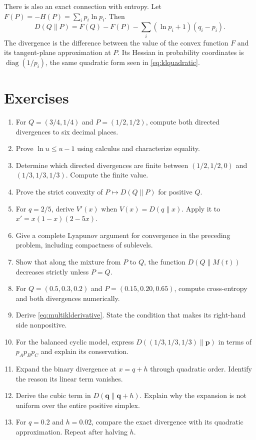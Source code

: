 \documentclass[11pt,oneside,openany]{book}
\theoremstyle{definition}
\theoremstyle{remark}
\newenvironment{exercises}{\begin{enumerate}[label=\thechapter.\arabic*,ref=\thechapter.\arabic*,leftmargin=2.8em,itemsep=6pt]}{\end{enumerate}}
\newcommand{\diag}{\operatorname{diag}}
\newcommand{\p}{\mathbf{p}}
\newcommand{\q}{\mathbf{q}}
\numberwithin{equation}{chapter}
\begin{document}
There is also an exact connection with entropy. Let $F(P)=-H(P)=\sum_i p_i\ln p_i$. Then
\begin{equation}\label{eq:bregman}
D(Q\|P)=F(Q)-F(P)-\sum_i(\ln p_i+1)(q_i-p_i).
\end{equation}
The divergence is the difference between the value of the convex function $F$ and its tangent-plane approximation at $P$. Its Hessian in probability coordinates is $\diag(1/p_i)$, the same quadratic form seen in \eqref{eq:klquadratic}.

\FloatBarrier
\section{Exercises}
\begin{exercises}
\item For $Q=(3/4,1/4)$ and $P=(1/2,1/2)$, compute both directed divergences to six decimal places.
\item Prove $\ln u\leq u-1$ using calculus and characterize equality.
\item Determine which directed divergences are finite between $(1/2,1/2,0)$ and $(1/3,1/3,1/3)$. Compute the finite value.
\item Prove the strict convexity of $P\mapsto D(Q\|P)$ for positive $Q$.
\item For $q=2/5$, derive $V'(x)$ when $V(x)=D(q\|x)$. Apply it to $x'=x(1-x)(2-5x)$.
\item Give a complete Lyapunov argument for convergence in the preceding problem, including compactness of sublevels.
\item Show that along the mixture from $P$ to $Q$, the function $D(Q\|M(t))$ decreases strictly unless $P=Q$.
\item For $Q=(0.5,0.3,0.2)$ and $P=(0.15,0.20,0.65)$, compute cross-entropy and both divergences numerically.
\item Derive \eqref{eq:multiklderivative}. State the condition that makes its right-hand side nonpositive.
\item For the balanced cyclic model, express $D((1/3,1/3,1/3)\|\p)$ in terms of $p_Ap_Bp_C$ and explain its conservation.
\item Expand the binary divergence at $x=q+h$ through quadratic order. Identify the reason its linear term vanishes.
\item Derive the cubic term in $D(\q\|\q+h)$. Explain why the expansion is not uniform over the entire positive simplex.
\item For $q=0.2$ and $h=0.02$, compare the exact divergence with its quadratic approximation. Repeat after halving $h$.

\end{exercises}
\end{document}
